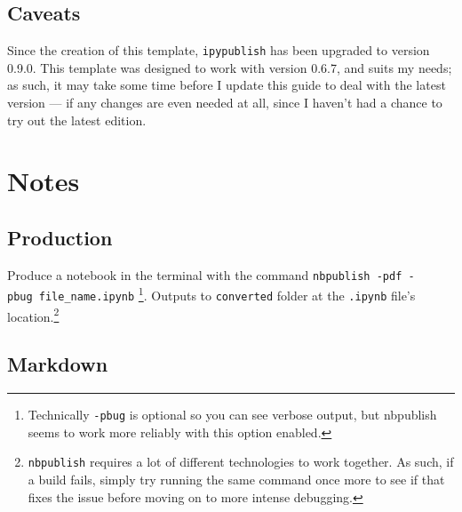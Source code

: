 \documentclass[10pt,parskip=half,
	toc=sectionentrywithdots,
	bibliography=totocnumbered,
	captions=tableheading,
    numbers=noendperiod,
    headings=standardclasses]{scrartcl}
\begin{document}
\subsection{Caveats}\label{caveats}

Since the creation of this template, \texttt{ipypublish} has been
upgraded to version 0.9.0. This template was designed to work with
version 0.6.7, and suits my needs; as such, it may take some time before
I update this guide to deal with the latest version --- if any changes
are even needed at all, since I haven't had a chance to try out the
latest edition.

\section{Notes}\label{notes}

\subsection{Production}\label{production}

Produce a notebook in the terminal with the command
\texttt{nbpublish\ -pdf\ -pbug\ file\_name.ipynb} \footnote{\hphantom{}
  Technically \texttt{-pbug} is optional so you can see verbose output,
  but nbpublish seems to work more reliably with this option enabled.}.
Outputs to \texttt{converted} folder at the \texttt{.ipynb} file's
location.\footnote{\hphantom{} \texttt{nbpublish} requires a lot of
  different technologies to work together. As such, if a build fails,
  simply try running the same command once more to see if that fixes the
  issue before moving on to more intense debugging.}

\subsection{Markdown}\label{markdown}
\end{document}
